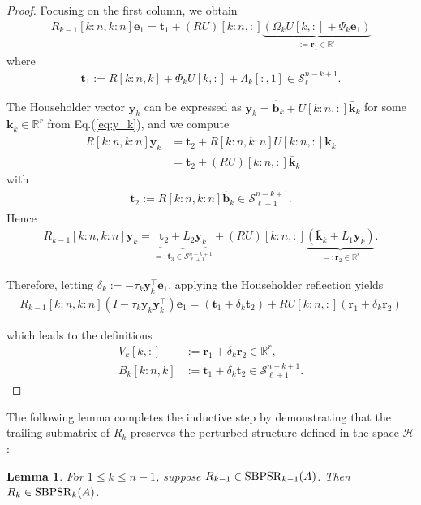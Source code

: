 \documentclass[a4paper,fleqn]{cas-sc}
\newtheorem{lemma}{Lemma}
\def\calH{{\mathcal H}}
\def\calS{{\mathcal S}}
\def\bfy{{\mathbf y}}
\def\bfe{{\mathbf e}}
\def\bfb{{\mathbf b}}
\def\bft{{\mathbf t}}
\def\bfr{{\mathbf r}}
\def\bfk{{\mathbf k}}
\begin{document}
\begin{proof}
    Focusing on the first column, we obtain
    \begin{align*}
        R_{k-1}[k:n,k:n] \bfe_1 = \bft_1 + (RU)[k:n,:]\underbrace{(\Omega_kU[k,:]+\Psi_k\bfe_1)}_{:=\bfr_1\in \mathbb R^r}
    \end{align*}
    where
    \begin{align*}
        \bft_1:=R[k:n,k]+\Phi_kU[k,:]+\Lambda_k[:,1] \in \calS_\ell^{n-k+1}.
    \end{align*}

    The Householder vector $\bfy_k$ can be expressed as $\bfy_k=\hat \bfb_k+U[k:n,:]\bar \bfk_k$ for some $\bar \bfk_k\in \mathbb R^r$ from Eq.(\ref{eq:y_k}), and we compute
    \begin{align*}
        R[k:n,k:n]\bfy_k&=\bft_2+R[k:n,k:n]U[k:n,:]\bar \bfk_k\\&
        =\bft_2+(RU)[k:n,:]\bar \bfk_k
    \end{align*}
    with
    \begin{align*}
        \bft_2:=R[k:n,k:n]\hat \bfb_k \in \calS_{\ell+1}^{n-k+1}.
    \end{align*}
    Hence
    \begin{align*}
        R_{k-1}[k:n,k:n]\bfy_k= \underbrace{\bft_2 + L_2\bfy_k}_{=:\bft_3\in\calS_{\ell+1}^{n-k+1}} + (RU)[k:n,:]\underbrace{(\bar \bfk_k+L_1\bfy_k)}_{=:\bfr_2\in \mathbb R^r}.
    \end{align*}

    Therefore, letting $\delta_k:=-\tau_k\bfy_k^\top\bfe_1$, applying the Householder reflection yields
    \begin{align*}
        R_{k-1}[k:n,k:n](I-\tau_k\bfy_k\bfy_k^\top)\bfe_1 = (\bft_1 + \delta_k \bft_2) + RU[k:n,:](\bfr_1+\delta_k\bfr_2)
    \end{align*}

    which leads to the definitions
    \begin{align}
        V_k[k,:] &:= \bfr_1+\delta_k\bfr_2 \in \mathbb R^r, \label{eq:rq_col_1} \\
        B_k[k:n,k]&:=\bft_1 + \delta_k \bft_2 \in \calS_{\ell+1}^{n-k+1}. \label{eq:rq_col_2}
    \end{align}
\end{proof}

The following lemma completes the inductive step by demonstrating that the trailing submatrix of $R_k$ preserves the perturbed structure defined in the space $\calH$:

\begin{lemma} \label{lemma: RQ_sub_matrix}
    For $1\leq k \leq n-1$, suppose $R_{k-1}  \in {\rm SBPSR}_{k-1}(A)$. Then $R_k \in {\rm SBPSR}_k(A)$. 
\end{lemma}
\end{document}
